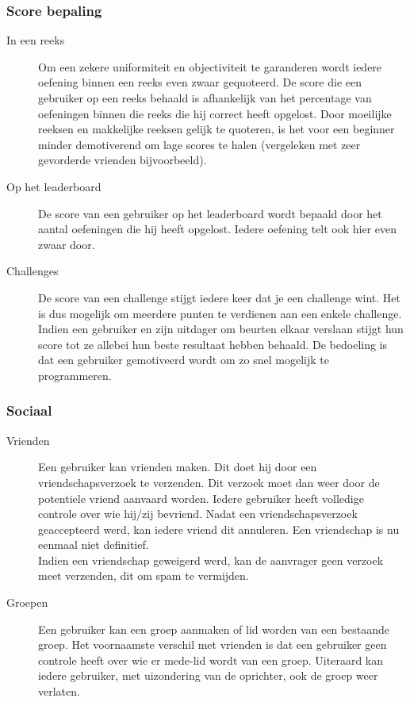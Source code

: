 \subsubsection{Score bepaling}
\begin{description}
\item[In een reeks] Om een zekere uniformiteit en objectiviteit te garanderen wordt iedere oefening binnen een reeks even zwaar gequoteerd. De score
    die een gebruiker op een reeks behaald is afhankelijk van het percentage van oefeningen binnen die reeks die hij correct heeft opgelost.
    Door moeilijke reeksen en makkelijke reeksen gelijk te quoteren, is het voor een beginner minder demotiverend om lage scores te halen
    (vergeleken met zeer gevorderde vrienden bijvoorbeeld).
\item[Op het leaderboard] De score van een gebruiker op het leaderboard wordt bepaald door het aantal oefeningen die hij heeft opgelost. Iedere oefening
    telt ook hier even zwaar door.
\item[Challenges] De score van een challenge stijgt iedere keer dat je een challenge wint. Het is dus mogelijk om meerdere punten te verdienen aan een enkele
    challenge. Indien een gebruiker en zijn uitdager om beurten elkaar verslaan stijgt hun score tot ze allebei hun beste resultaat hebben behaald. De bedoeling
    is dat een gebruiker gemotiveerd wordt om zo snel mogelijk te programmeren.
\end{description}

\subsubsection{Sociaal}
\begin{description}
\item[Vrienden] Een gebruiker kan vrienden maken. Dit doet hij door een vriendschapsverzoek te verzenden. Dit verzoek moet dan weer door
de potentiele vriend aanvaard worden. Iedere gebruiker heeft volledige controle over wie hij/zij bevriend. Nadat een vriendschapsverzoek
geaccepteerd werd, kan iedere vriend dit annuleren. Een vriendschap is nu eenmaal niet definitief. \\
Indien een vriendschap geweigerd werd, kan de aanvrager geen verzoek meet verzenden, dit om spam te vermijden.
\item[Groepen] Een gebruiker kan een groep aanmaken of lid worden van een bestaande groep. Het voornaamste verschil met vrienden is dat
een gebruiker geen controle heeft over wie er mede-lid wordt van een groep. Uiteraard kan iedere gebruiker, met uizondering van de oprichter,
ook de groep weer verlaten.
\end{description}

